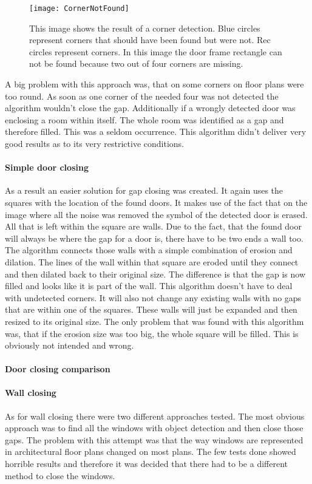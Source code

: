 \begin{figure}[H]
	\centering
	\texttt{[image: CornerNotFound]}
	\caption{This image shows the result of a corner detection. Blue circles represent corners that should have been found but were not. Rec circles represent corners. In this image the door frame rectangle can not be found because two out of four corners are missing.}
	\label{fig:CornerNotFound}
\end{figure}

A big problem with this approach was, that on some corners on floor plans were too round. As soon as one corner of the needed four was not detected the algorithm wouldn't close the gap. Additionally if a wrongly detected door was enclosing a room within itself. The whole room was identified as a gap and therefore filled. This was a seldom occurrence. This algorithm didn't deliver very good results as to its very restrictive conditions.

\paragraph{Simple door closing}
As a result an easier solution for gap closing was created. It again uses the squares with the location of the found doors. It makes use of the fact that on the image where all the noise was removed the symbol of the detected door is erased. All that is left within the square are walls. Due to the fact, that the found door will always be where the gap for a door is, there have to be two ends a wall too. The algorithm connects those walls with a simple combination of erosion and dilation. The lines of the wall within that square are eroded until they connect and then dilated back to their original size. The difference is that the gap is now filled and looks like it is part of the wall. This algorithm doesn't have to deal with undetected corners. It will also not change any existing walls with no gaps that are within one of the squares. These walls will just be expanded and then resized to its original size. The only problem that was found with this algorithm was, that if the erosion size was too big, the whole square will be filled. This is obviously not intended and wrong.

\paragraph{Door closing comparison}
\paragraph{Wall closing}
\label{sub:WallClosing}
As for wall closing there were two different approaches tested. The most obvious approach was to find all the windows with object detection and then close those gaps. The problem with this attempt was that the way windows are represented in architectural floor plans changed on most plans. The few tests done showed horrible results and therefore it was decided that there had to be a different method to close the windows.

